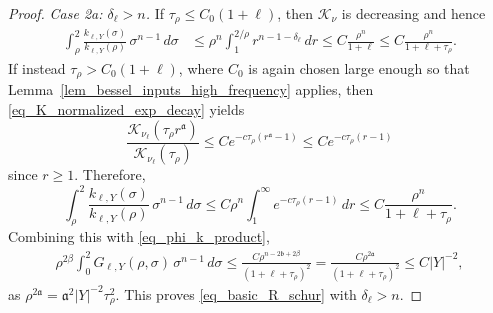 \documentclass[12pt]{amsart}
\begin{document}
\begin{proof}
\textit{Case 2a: $\delta_\ell > n$.} If $\tau_\rho\le C_0(1+\ell)$, then $\mathcal K_\nu$ is decreasing and hence
\begin{align}\label{eq_formula3}
\int_\rho^2 \frac{k_{\ell,Y}(\sigma)}{k_{\ell,Y}(\rho)}\,\sigma^{n-1}\,d\sigma
&\le \rho^n
    \int_1^{2/\rho} r^{n-1-\delta_\ell}\,dr
    \le C\frac{\rho^n}{1+\ell}
    \le C\frac{\rho^n}{1+ \ell + \tau_\rho}.
\end{align}
If instead $\tau_\rho>C_0 (1+\ell)$, where $C_0$ is again chosen large enough so that Lemma~\ref{lem_bessel_inputs_high_frequency} applies, then \eqref{eq_K_normalized_exp_decay} yields
\begin{equation*}
    \frac{\mathcal K_{\nu_\ell}(\tau_\rho r^{\mathfrak a})}
         {\mathcal K_{\nu_\ell}(\tau_\rho)}
    \le
    C e^{-c\tau_\rho(r^{\mathfrak a}-1)}
    \le C e^{-c\tau_\rho(r-1)}
\end{equation*}
since $r\ge 1$. Therefore,
\begin{equation}\label{eq_K_ratio_large_ell}
    \int_\rho^2\frac{k_{\ell,Y}(\sigma)}{k_{\ell,Y}(\rho)}\,\sigma^{n-1}\,d\sigma
    \le C\rho^n  \int_1^\infty e^{-c\tau_\rho(r-1)}\,dr
    \le C\frac{\rho^n}{1+\ell+\tau_\rho}.
\end{equation}
Combining this with \eqref{eq_phi_k_product},
\begin{align*}
    \rho^{2\beta}
    \int_0^2
        G_{\ell,Y}(\rho,\sigma)
    \, \sigma^{n-1} \, d\sigma
    \le \frac{C \rho^{n-2 \mathfrak b+2\beta} }{(1+\ell + \tau_\rho)^2}
    = \frac{C \rho^{2 \mathfrak a} }{(1+\ell + \tau_\rho)^2}
    \le C |Y|^{-2},
\end{align*}
as $\rho^{2 \mathfrak a} = \mathfrak a^2 |Y|^{-2} \tau_\rho^2$. This proves \eqref{eq_basic_R_schur} with $\delta_\ell >n$.


\end{proof}
\end{document}
